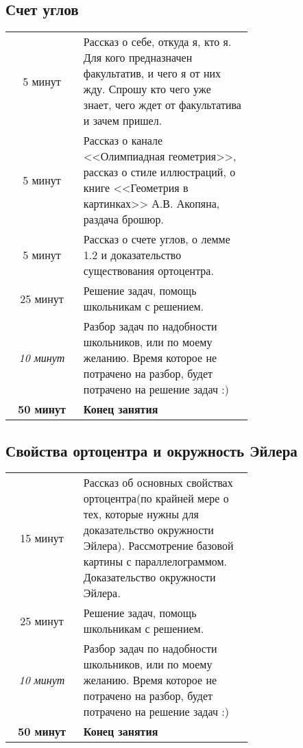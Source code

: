 \subsection{Счет углов}
\begin{center}
    \begin{tabular}{c | p{0.7\linewidth}}
        5 минут & Рассказ о себе, откуда я, кто я. Для кого предназначен факультатив, и чего я от них жду. Спрошу кто чего уже знает, чего ждет от факультатива и зачем пришел. \\ [3mm]
        
        5 минут & Рассказ о канале <<Олимпиадная геометрия>>, рассказ о стиле иллюстраций, о книге <<Геометрия в картинках>>  А.В. Акопяна, раздача брошюр. \\ [3mm]
        
        5 минут & Рассказ о счете углов, о лемме {\color{red}1.2} и доказательство существования ортоцентра. \\ [3mm]
        
        25 минут & Решение задач, помощь школьникам с решением.\\ [3mm]
        
        \textit{10 минут} & Разбор задач по надобности школьников, или по моему желанию. Время которое не потрачено на разбор, будет потрачено на решение задач :)\\ [3mm]
        
        \hline 
        \textbf{50 минут} & \textbf{Конец занятия}
    \end{tabular}
\end{center}

\subsection{Свойства ортоцентра и окружность Эйлера}
\begin{center}
    \begin{tabular}{c | p{0.7\linewidth}}                
        15 минут& Рассказ об основных свойствах ортоцентра\footnotemark(по крайней мере о тех, которые нужны для доказательство окружности Эйлера). Рассмотрение базовой картины с параллелограммом. Доказательство окружности Эйлера.\\ [3mm]
        
        25 минут & Решение задач, помощь школьникам с решением.\\ [3mm]
        
        \textit{10 минут} & Разбор задач по надобности школьников, или по моему желанию. Время которое не потрачено на разбор, будет потрачено на решение задач :)\\ [3mm]
        
        \hline 
        \textbf{50 минут} & \textbf{Конец занятия}
    \end{tabular}
\end{center}
